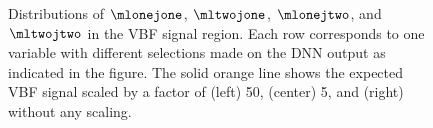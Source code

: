 \begin{figure}[h]
{        }
        {\caption[Distributions of $\mlonejone$, $\mltwojone$, $\mlonejtwo$, and $\mltwojtwo$ in the VBF \TwoJet signal region.]{Distributions of $\mlonejone$, $\mltwojone$, $\mlonejtwo$, and $\mltwojtwo$ in the VBF \TwoJet signal region.
                Each row corresponds to one variable with different selections made on the DNN output as indicated in the figure. The solid orange line shows the expected VBF signal scaled by a factor of (left) 50, (center) 5, and (right) without any scaling.
                \label{app:fig:dnn-inputs-vbf-top2} }}
    \end{figure}


    \begin{figure}[h]
        \centering
         \\
\end{figure}
